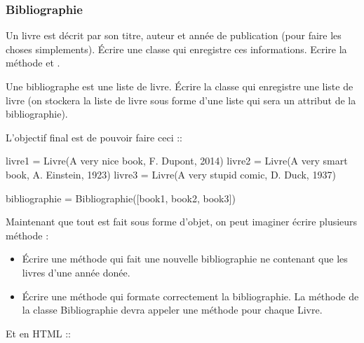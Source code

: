 \documentclass[letterpaper,10pt,english]{sphinxhowto}
\begin{document}
\subsubsection{Bibliographie}
\label{\detokenize{cours6_objet_corr_exercices:bibliographie}}
\sphinxAtStartPar
Un livre est décrit par son titre, auteur et année de publication (pour faire les choses simplements). Écrire une classe  qui enregistre ces informations. Ecrire la méthode  et .

\sphinxAtStartPar
Une bibliographe est une liste de livre. Écrire la classe  qui enregistre une liste de livre (on stockera la liste de livre sous forme d’une liste qui sera un attribut de la bibliographie).

\sphinxAtStartPar
L’objectif final est de pouvoir faire ceci ::

\begin{sphinxVerbatim}[commandchars=\\\{\}]
livre1 = Livre(\PYGZdq{}A very nice book\PYGZdq{}, \PYGZdq{}F. Dupont\PYGZdq{}, 2014)
livre2 = Livre(\PYGZdq{}A very smart book\PYGZdq{}, \PYGZdq{}A. Einstein\PYGZdq{}, 1923)
livre3 = Livre(\PYGZdq{}A very stupid comic\PYGZdq{}, \PYGZdq{}D. Duck\PYGZdq{}, 1937)

bibliographie = Bibliographie([book1, book2, book3])
\end{sphinxVerbatim}

\sphinxAtStartPar
Maintenant que tout est fait sous forme d’objet, on peut imaginer écrire plusieurs méthode :
\begin{itemize}
\item {} 
\sphinxAtStartPar
Écrire une méthode  qui fait une nouvelle bibliographie ne contenant que les livres d’une année donée.

\item {} 
\sphinxAtStartPar
Écrire une méthode  qui formate correctement la bibliographie. La méthode de la classe Bibliographie devra appeler une méthode pour chaque Livre.

\end{itemize}

\sphinxAtStartPar
Et en HTML ::
\end{document}
